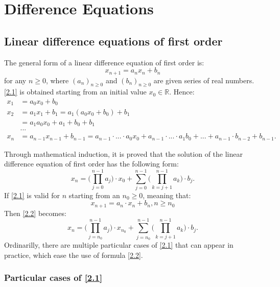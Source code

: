 \documentclass[a4paper,11pt]{report}
\newcommand{\R}{\mathbb{R}}
\begin{document}
    
    \chapter{Difference Equations}
    \section{Linear difference equations of first order}
    The general form of a linear difference equation of first order is:
    \begin{equation} 
     x_{n+1}=a_{n}x_{n}+b_{n} \label{2.1}
    \end{equation}
    for any $n \geq 0$, where $(a_{n})_{n\geq 0}$ and $(b_{n})_{n\geq 0}$ are given series of real numbers. 
\eqref{2.1} is obtained starting from an initial value $x_{0} \in \R$. Hence:
\begin{align*}
 x_{1} & =a_{0}x_{0}+b_{0}\\
   x_{2} & =a_{1}x_{1}+b_{1} = a_{1}(a_{0}x_{0}+b_{0})+b_{1}\\
  & = a_{1}a_{0}x_{0}+a_{1}+b_{0}+b_{1}\\
  & ...\\
   x_{n}&=a_{n-1}x_{n-1}+b_{n-1} = a_{n-1}\cdot ... \cdot a_{0}x_{0}+a_{n-1}\cdot ...\cdot a_{1}b_{0}+...+a_{n-1}\cdot b_{n-2}+b_{n-1}.
\end{align*}

Through mathematical induction, it is proved that the solution of the linear difference equation of first order has the following form:
\begin{equation}\label{2.2}
 x_{n}=\bigg( \prod_{j=0}^{n-1} a_{j} \bigg) \cdot x_{0} + \sum_{j=0}^{n-1} \bigg( \prod_{k=j+1}^{n-1} a_{k} \bigg)\cdot b_{j}.
\end{equation}
If \eqref{2.1} is valid for $n$ starting from an $n_{0} \geq 0$, meaning that:
\begin{equation}\label{2.3}
 x_{n+1}=a_{n}\cdot x_{n}+b_{n}, n\geq n_{0}
\end{equation}
Then \eqref{2.2} becomes:
\begin{equation}
 x_{n}=\bigg( \prod_{j=n_{0}}^{n-1} a_{j} \bigg) \cdot x_{n_{0}} + \sum_{j=n_{0}}^{n-1} \bigg( \prod_{k=j+1}^{n-1} a_{k} \bigg)\cdot b_{j}.
\end{equation}
Ordinarilly, there are multiple particular cases of \eqref{2.1} that can appear in practice, which ease the use of formula \eqref{2.2}.
\subsection{Particular cases of \eqref{2.1}}
\end{document}
